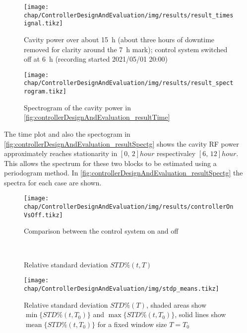 \begin{figure}[tbh]
	\centering
	\texttt{[image: chap/ControllerDesignAndEvaluation/img/results/result\_timesignal.tikz]}
	\caption{Cavity power over about \SI{15}{\hour} (about three hours of downtime removed for clarity around the \SI{7}{\hour} mark); control system switched off at \SI{6}{\hour} (recording started 2021/05/01 20:00)}
	\label{fig:controllerDesignAndEvaluation_resultTime}
\end{figure}

\begin{figure}[tbh]
	\centering
	\texttt{[image: chap/ControllerDesignAndEvaluation/img/results/result\_spectrogram.tikz]}
	\caption{Spectrogram of the cavity power in \autoref{fig:controllerDesignAndEvaluation_resultTime}}
	\label{fig:controllerDesignAndEvaluation_resultSpectg}
\end{figure}

The time plot and also the spectogram in \autoref{fig:controllerDesignAndEvaluation_resultSpectg} shows the cavity RF power approximately reaches stationarity in $[0,\,2] \si{hour}$ respectivaley $[6,\,12] \si{hour}$. This allows the spectrum for these two blocks to be estimated using a periodogram method. In \autoref{fig:controllerDesignAndEvaluation_resultSpectg} the spectra for each case are shown.

\begin{figure}[tbh]
	\centering
	\texttt{[image: chap/ControllerDesignAndEvaluation/img/results/controllerOnVsOff.tikz]}
	\caption{Comparison between the control system on and off}
	\label{fig:controllerDesignAndEvaluation_resultComp}
\end{figure}

\begin{figure}[tbh]
    \centering
        \\
       \caption{Relative standard deviation $STD\%(t,T)$}
    \label{fig:controllerDesignAndEvaluation_resultSTDp}
\end{figure}

\begin{figure}[tbh]
	\centering
	\texttt{[image: chap/ControllerDesignAndEvaluation/img/stdp\_means.tikz]}
	\caption{Relative standard deviation $STD\%(T)$, shaded areas show $\operatorname{min}\{STD\%(t,T_0)\}$ and $\operatorname{max}\{STD\%(t,T_0)\}$, solid lines show $\operatorname{mean}\{STD\%(t,T_0)\}$ for a fixed window size $T=T_0$}
	\label{fig:controllerDesignAndEvaluation_resultSTDp_means}
\end{figure}


